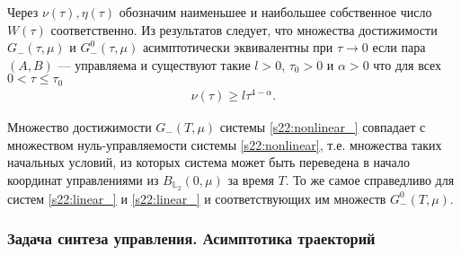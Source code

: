 \documentclass[../main.tex]{subfiles}
\begin{document}

Через $\nu(\tau), \eta(\tau)$ обозначим наименьшее и наибольшее собственное число $W(\tau)$ соответственно. 
Из результатов  \cite{Polyak2001,GusOsSteklov,Osipov,GusevMotor} следует, что множества достижимости  
$G_{-}(\tau,\mu)$ и $G_{-}^0(\tau,\mu)$ асимптотически эквивалентны при $\tau \to 0$ если пара  $(A,B)$ --- управляема 
и существуют такие $ l > 0$, $\tau_0 > 0$ и $\alpha > 0$ что для всех $0 < \tau \leqslant \tau_0 $
        \begin{gather}\label{s22:gramas}
            \nu(\tau)\geqslant l\tau^{4-\alpha}.
        \end{gather}

\begin{zam}
    Множество достижимости $G_{-}(T,\mu)$ системы \eqref{s22:nonlinear_} совпадает с множеством нуль-управляемости системы \eqref{s22:nonlinear}, т.е. множества таких начальных условий, из которых система может быть переведена в начало координат управлениями из $B_{\mathbb{L}_2}(0,\mu) $ за время $T$. 
    То же самое справедливо для систем \eqref{s22:linear_} и \eqref{s22:linear_} и соответствующих им множеств $G_{-}^0(T,\mu)$.
\end{zam}

\subsubsection{Задача синтеза управления. Асимптотика траекторий}
\end{document}
